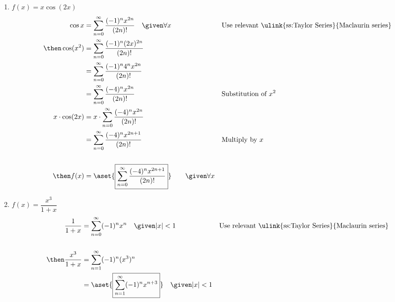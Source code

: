 \begin{enumerate}
    \begin{enumerate}[itemsep=24em]
      \item \(f(x) = x \cos (2x)\)
        \begin{align*}
          \cos x &= \sum_{n=0}^{\infty} \frac{(-1)^nx^{2n} }{(2n)!} \quad \given \forall x
                 && \text{Use relevant \ulink{ss:Taylor Series}{Maclaurin series}} \\
          \then \cos(x^2) &= \sum_{n=0}^{\infty} \frac{(-1)^n(2x)^{2n} }{(2n)!} \\
                          &= \sum_{n=0}^{\infty} \frac{(-1)^n 4^n x^{2n} }{(2n)!} \\
                          &= \sum_{n=0}^{\infty} \frac{(-4)^n x^{2n} }{(2n)!}
                          && \text{Substitution of}~x^2 \\
          x \cdot \cos (2x) &= x \cdot \sum_{n=0}^{\infty} \frac{(-4)^nx^{2n} }{(2n)!} \\
                            &= \sum_{n=0}^{\infty} \frac{(-4)^n x^{2n+1} }{(2n)!}
                            && \text{Multiply by } x\\
                            \\
          \then f(x) &= \aset{\boxed{\sum_{n=0}^{\infty} \frac{(-4)^nx^{2n+1} }{(2n)!}}}
          \qquad \given \forall x
        \end{align*}

      \vspace{-22em}
      \item \(f(x) = \dfrac{x^3}{1+x}\)
        \begin{align*}
          \frac{1}{1+x} &= \sum_{n=0}^{\infty} (-1)^n x^n \quad \given |x| < 1
                 && \text{Use relevant \ulink{ss:Taylor Series}{Maclaurin series}} \\
                 \\
          \then \frac{x^3}{1+x} &= \sum_{n=1}^{\infty} (-1)^n (x^3)^n \\
                 &= \aset{\boxed{\sum_{n=1}^{\infty} (-1)^n x^{n+3}}} \quad \given |x| < 1
        \end{align*}
    \end{enumerate}

\newpage %


\end{enumerate}
